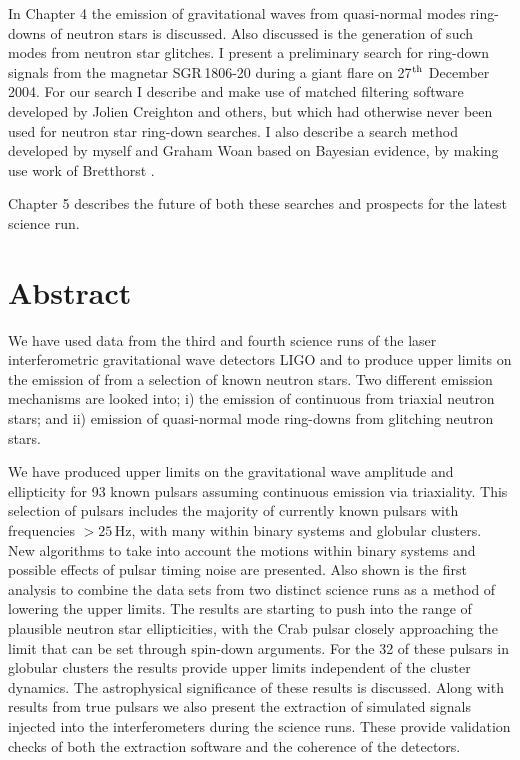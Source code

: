 In Chapter 4 the emission of gravitational waves from quasi-normal modes ring-downs of neutron
stars is discussed. Also discussed is the generation of such modes from neutron star glitches. I
present a preliminary search for \gw ring-down signals from the magnetar SGR\,1806-20 during a
giant flare on 27$^{\rm th}$ December 2004. For our search I describe and make use of matched
filtering software developed by Jolien Creighton and others, but which had otherwise never been used
for neutron star ring-down searches. I also describe a search method developed by myself and
Graham Woan based on Bayesian evidence, by making use work of Bretthorst \cite{Bretthorst:1988}.

Chapter 5 describes the future of both these searches and prospects for the latest science run.

\newpage

\chapter*{Abstract}
We have used data from the third and fourth science runs of the laser interferometric
gravitational wave detectors LIGO and \geo to produce upper limits on the emission of \gws from a
selection of known neutron stars. Two different emission mechanisms are looked into; i) the
emission of continuous \gws from triaxial neutron stars; and ii) emission of quasi-normal mode
ring-downs from glitching neutron stars.

We have produced upper limits on the gravitational wave amplitude and ellipticity for 93 known
pulsars assuming continuous emission via triaxiality. This selection of pulsars includes the
majority of currently known pulsars with frequencies $> 25$\,Hz, with many within binary systems and
globular clusters. New algorithms to take into account the motions within binary systems and
possible effects of pulsar timing noise are presented. Also shown is the first analysis to combine
the data sets from two distinct science runs as a method of lowering the upper limits. The results
are starting to push into the range of plausible neutron star ellipticities, with the Crab pulsar
closely approaching the limit that can be set through spin-down arguments. For the 32 of these
pulsars in globular clusters the results provide upper limits independent of the cluster dynamics.
The astrophysical significance of these results is discussed. Along with results from true pulsars
we also present the extraction of simulated signals injected into the interferometers during the
science runs. These provide validation checks of both the extraction software and the coherence of
the detectors.

